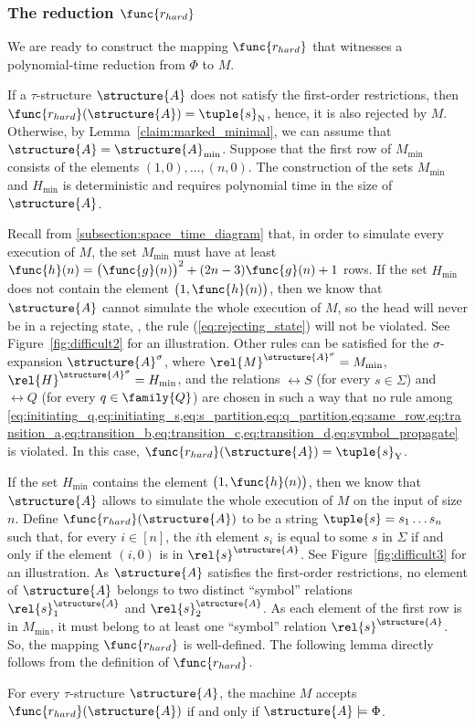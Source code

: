 \documentclass{lmcs}
\begin{document}
\subsubsection*{The reduction $\func{r_{hard}}$}
We are ready to construct the mapping $\func{r_{hard}}$ that witnesses a polynomial-time reduction from $\Phi$ to $M$.

If a $\tau$-structure $\structure{A}$ does not satisfy the first-order restrictions, then $\func{r_{hard}}(\structure{A})=\tuple{s}_{\mathrm{N}}$, hence, it is also rejected by $M$.
Otherwise, by Lemma~\ref{claim:marked_minimal}, we can assume that $\structure{A} = \structure{A}_{\min}$.
Suppose that the first row of $M_{\min}$ consists of the elements $(1,0),\ldots,(n,0)$.
The construction of the sets $M_{\min}$ and $H_{\min}$ is deterministic and requires polynomial time in the size of $\structure{A}$.

Recall from \cref{subsection:space_time_diagram} that, in order to simulate every execution of $M$, the set $M_{\min}$ must have at least $\func{h}(n) = \bigl(\func{g}(n)\bigr)^2 + (2n-3)\func{g}(n) + 1$ rows.
If the set $H_{\min}$ does not contain the element $\bigl(1,\func{h}(n)\bigr)$, then we know that $\structure{A}$ cannot simulate the whole execution of $M$, so the head will never be in a rejecting state, \ie, the rule (\ref{eq:rejecting_state}) will not be violated.
See Figure~\ref{fig:difficult2} for an illustration.
Other rules can be satisfied for the $\sigma$-expansion $\structure{A}^\sigma$, where $\rel{M}^{\structure{A}^\sigma} = M_{\min}$, $\rel{H}^{\structure{A}^\sigma}=H_{\min}$, and the relations $\rel{S}$ (for every $s\in\Sigma$) and $\rel{Q}$ (for every $q\in\family{Q}$) are chosen in such a way that no rule among \cref{eq:initiating_q,eq:initiating_s,eq:s_partition,eq:q_partition,eq:same_row,eq:transition_a,eq:transition_b,eq:transition_c,eq:transition_d,eq:symbol_propagate} is violated.
In this case, $\func{r_{hard}}(\structure{A}) = \tuple{s}_{\mathrm{Y}}$.


If the set $H_{\min}$ contains the element $\bigl(1,\func{h}(n)\bigr)$, then we know that $\structure{A}$ allows to simulate the whole execution of $M$ on the input of size $n$.
Define $\func{r_{hard}}(\structure{A})$ to be a string $\tuple{s}=s_1\ldots s_n$ such that, for every $i\in[n]$, the $i$th element $s_i$ is equal to some $s$ in $\Sigma$ if and only if the element $(i,0)$ is in $\rel{s}^\structure{A}$.
See Figure~\ref{fig:difficult3} for an illustration.
As $\structure{A}$ satisfies the first-order restrictions, no element of $\structure{A}$ belongs to two distinct ``symbol'' relations $\rel{s}_1^\structure{A}$ and $\rel{s}_2^\structure{A}$.
As each element of the first row is in $M_{\min}$, it must belong to at least one ``symbol'' relation $\rel{s}^\structure{A}$.
So, the mapping $\func{r_{hard}}$ is well-defined.
The following lemma directly follows from the definition of $\func{r_{hard}}$.
\begin{lem}\label{lemma:mmsnpineq_reduces_to_np} 
For every $\tau$-structure $\structure{A}$, the machine $M$ accepts $\func{r_{hard}}(\structure{A})$ if and only if $\structure{A}\models\Phi$.
\end{lem}
\end{document}
